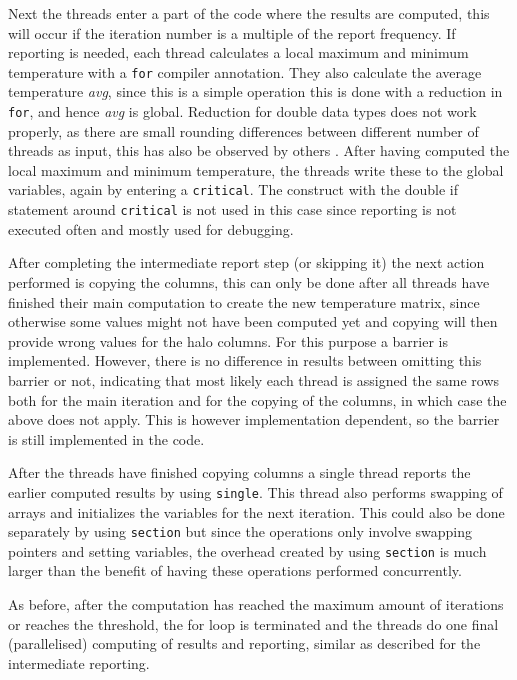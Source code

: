 \documentclass[11pt,a4paper,onecolumn]{article}
\begin{document}
Next the threads enter a part of the code where the results are computed, this will occur if the iteration number is a multiple of the report frequency. If reporting is needed, each thread calculates a local maximum and minimum temperature with a \texttt{for} compiler annotation. They also calculate the average temperature \emph{avg}, since this is a simple operation this is done with a reduction in \texttt{for}, and hence \emph{avg} is global. Reduction for double data types does not work properly, as there are small rounding differences between different number of threads as input, this has also be observed by others \cite{chandra}. After having computed the local maximum and minimum temperature, the threads write these to the global variables, again by entering a \texttt{critical}. The construct with the double if statement around \texttt{critical} is not used in this case since reporting is not executed often and mostly used for debugging.

After completing the intermediate report step (or skipping it) the next action performed is copying the columns, this can only be done after all threads have finished their main computation to create the new temperature matrix, since otherwise some values might not have been computed yet and copying will then provide wrong values for the halo columns. For this purpose a barrier is implemented. However, there is no difference in results between omitting this barrier or not, indicating that most likely each thread is assigned the same rows both for the main iteration and for the copying of the columns, in which case the above does not apply. This is however implementation dependent, so the barrier is still implemented in the code.

After the threads have finished copying columns a single thread reports the earlier computed results by using \texttt{single}. This thread also performs swapping of arrays and initializes the variables for the next iteration. This could also be done separately by using \texttt{section} but since the operations only involve swapping pointers and setting variables, the overhead created by using \texttt{section} is much larger than the benefit of having these operations performed concurrently.

As before, after the computation has reached the maximum amount of iterations or reaches the threshold, the for loop is terminated and the threads do one final (parallelised) computing of results and reporting, similar as described for the intermediate reporting.
\end{document}
